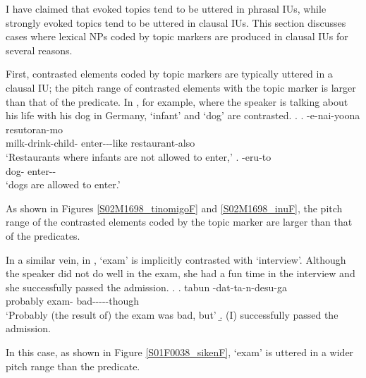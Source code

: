 I have claimed that
evoked topics tend to be uttered in phrasal IUs,
while strongly evoked topics tend to be uttered in clausal IUs.
This section discusses cases where
lexical NPs coded by topic markers are produced in clausal IUs
for several reasons.

First, contrasted elements coded by topic markers are typically uttered in a clausal IU;
the pitch range of contrasted elements with the topic marker  is larger than
that of the predicate.
In \Next, for example,
where the speaker is talking about his life with his dog in Germany,
 `infant' and  `dog' are contrasted.
%
\ex.\label{S02M1698_tinomigo}
 \ag.  -e-nai-yoona resutoran-mo \tp{\dvline} \\
 		milk-drink-child- enter---like restaurant-also {} \\
		`Restaurants where infants are not allowed to enter,'
 \bg.  -eru-to \tp{\dvline} \\
 		dog- enter-- {}\\
 		`dogs are allowed to enter.'

As shown in Figures \ref{S02M1698_tinomigoF} and \ref{S02M1698_inuF},
the pitch range of the contrasted elements coded by the topic marker  are larger than that of the predicates.

In a similar vein,
in \Next,
 `exam' is implicitly contrasted with  `interview'.
Although the speaker did not do well in the exam,
she had a fun time in the interview and she successfully passed the admission.
\ex.\label{S01F0038_siken}
 \ag. tabun  -dat-ta-n-desu-ga \tp{\dvline} \\
 	probably exam- bad-----though {} \\
	`Probably (the result of) the exam was bad, but'
 \b. (I) successfully passed the admission.

In this case,
as shown in Figure \ref{S01F0038_sikenF},
 `exam' is uttered in a wider pitch range than the predicate.

